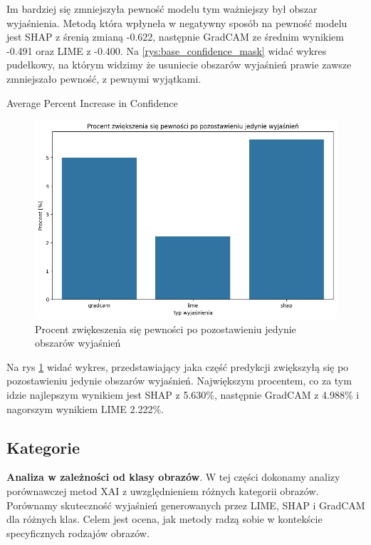 Im bardziej się zmniejszyła pewność modelu tym ważniejszy był obszar wyjaśnienia.
Metodą która wpłyneła w negatywny sposób na pewność modelu jest SHAP z śrenią zmianą -0.622, następnie GradCAM ze średnim wynikiem -0.491 oraz LIME z -0.400.
Na \ref{rys:base_confidence_mask} widać wykres pudełkowy, na którym widzimy że usuniecie obszarów wyjaśnień prawie zawsze zmniejszało pewność, z pewnymi wyjątkami.

Average Percent Increase in Confidence
\begin{figure}
	\centering\includegraphics[width=.6\textwidth]{img/base_confidence_womask_percent}
	\caption{Procent zwiękeszenia się pewności po pozostawieniu jedynie obszarów wyjaśnień}  \label{rys:base_confidence_womask_percent}
\end{figure}

Na rys \ref{rys:base_confidence_womask_percent} widać wykres, przedstawiający jaka część predykcji zwiększyłą się po pozostawieniu jedynie obszarów wyjaśnień.
Największym procentem, co za tym idzie najlepszym wynikiem jest SHAP z 5.630\%, następnie GradCAM z 4.988\% i nagorszym wynikiem LIME 2.222\%.

\subsection*{Kategorie}

\textbf{Analiza w zależności od klasy obrazów}.
W tej części dokonamy analizy porównawczej metod XAI z uwzględnieniem różnych kategorii obrazów.
Porównamy skuteczność wyjaśnień generowanych przez LIME, SHAP i GradCAM dla różnych klas.
Celem jest ocena, jak metody radzą sobie w kontekście specyficznych rodzajów obrazów.

